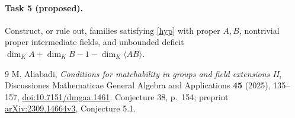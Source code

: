 \documentclass[11pt]{article}
\begin{document}
\paragraph{Task 5 (proposed).}
Construct, or rule out, families satisfying \eqref{hyp} with proper
$A,B$, nontrivial proper intermediate fields, and unbounded deficit
$\dim_K A+\dim_K B-1-\dim_K\langle AB\rangle$.

\begin{thebibliography}{9}
 M. Aliabadi, \emph{Conditions for matchability in groups and
field extensions II}, Discussiones Mathematicae General Algebra and
Applications \textbf{45} (2025), 135--157,
\href{https://doi.org/10.7151/dmgaa.1461}{doi:10.7151/dmgaa.1461}.
Conjecture 38, p.~154; preprint
\href{https://arxiv.org/abs/2309.14664}{arXiv:2309.14664v3}, Conjecture 5.1.
\end{thebibliography}
\end{document}
